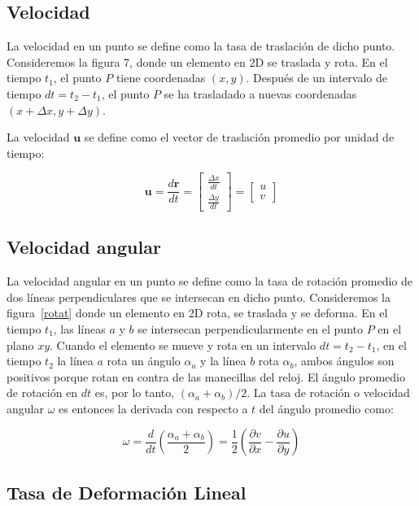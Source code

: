 \documentclass[10pt, oneside]{article}
\begin{document}
\subsection{Velocidad}

La velocidad en un punto se define como la tasa de traslación de dicho punto. Consideremos la figura 7, donde un elemento en 2D se traslada y rota. En el tiempo $t_1$, el punto $P$ tiene coordenadas $(x, y)$. Después de un intervalo de tiempo $dt=t_2 - t_1$, el punto $P$ se ha trasladado a nuevas coordenadas $(x + \Delta x, y + \Delta y)$.

La velocidad $\mathbf{u}$ se define como el vector de traslación promedio por unidad de tiempo:

\[
\mathbf{u} = \frac{d\mathbf{r}}{dt} = \begin{bmatrix} \frac{\Delta x}{dt} \\ \frac{\Delta y}{dt} \end{bmatrix} = \begin{bmatrix} u \\ v \end{bmatrix}
\]

\subsection{Velocidad angular}

La velocidad angular en un punto se define como la tasa de rotación promedio de dos líneas perpendiculares que se intersecan en dicho punto. Consideremos la figura~\ref{rotat} donde un elemento en 2D rota, se traslada y se deforma. En el tiempo $t_1$, las líneas $a$ y $b$ se intersecan perpendicularmente en el punto $P$ en el plano $xy$. Cuando el elemento se mueve y rota en un intervalo $dt=t_2 - t_1$, en el tiempo $t_2$ la línea $a$ rota un ángulo $\alpha_a$ y la línea $b$ rota $\alpha_b$, ambos ángulos son positivos porque rotan en contra de las manecillas del reloj. El ángulo promedio de rotación en $dt$ es, por lo tanto, $(\alpha_a + \alpha_b)/2$. La tasa de rotación o velocidad angular $\omega$ es entonces la derivada con respecto a $t$ del ángulo promedio como:

\[
\omega = \frac{d}{dt}\left( \frac{\alpha_a + \alpha_b}{2} \right) = \frac{1}{2} \left( \frac{\partial v}{\partial x} - \frac{\partial u}{\partial y} \right)
\]

\subsection{Tasa de Deformación Lineal}
\end{document}
